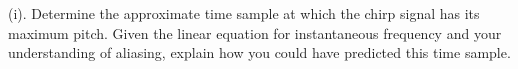 (i). Determine the approximate time sample at which the chirp signal has its maximum pitch. Given the linear equation for instantaneous frequency and your understanding of aliasing, explain how you could have predicted this time sample.
